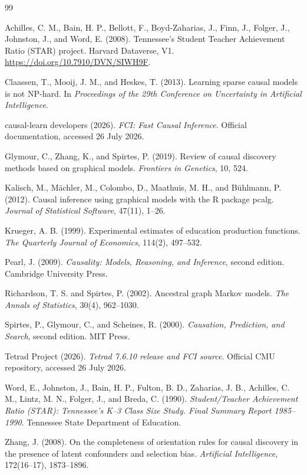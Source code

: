 \documentclass[11pt,a4paper]{article}
\begin{document}
\small

\begin{thebibliography}{99}

Achilles, C. M., Bain, H. P., Bellott, F., Boyd-Zaharias, J., Finn, J.,
Folger, J., Johnston, J., and Word, E. (2008).
Tennessee's Student Teacher Achievement Ratio (STAR) project.
Harvard Dataverse, V1. \url{https://doi.org/10.7910/DVN/SIWH9F}.

Claassen, T., Mooij, J. M., and Heskes, T. (2013).
Learning sparse causal models is not NP-hard.
In \textit{Proceedings of the 29th Conference on Uncertainty in Artificial
Intelligence}.

causal-learn developers (2026).
\textit{FCI: Fast Causal Inference}. Official documentation, accessed
26 July 2026.

Glymour, C., Zhang, K., and Spirtes, P. (2019).
Review of causal discovery methods based on graphical models.
\textit{Frontiers in Genetics}, 10, 524.

Kalisch, M., M{\"a}chler, M., Colombo, D., Maathuis, M. H., and
B{\"u}hlmann, P. (2012).
Causal inference using graphical models with the R package pcalg.
\textit{Journal of Statistical Software}, 47(11), 1--26.

Krueger, A. B. (1999).
Experimental estimates of education production functions.
\textit{The Quarterly Journal of Economics}, 114(2), 497--532.

Pearl, J. (2009).
\textit{Causality: Models, Reasoning, and Inference}, second edition.
Cambridge University Press.

Richardson, T. S. and Spirtes, P. (2002).
Ancestral graph Markov models.
\textit{The Annals of Statistics}, 30(4), 962--1030.

Spirtes, P., Glymour, C., and Scheines, R. (2000).
\textit{Causation, Prediction, and Search}, second edition. MIT Press.

Tetrad Project (2026).
\textit{Tetrad 7.6.10 release and FCI source}. Official CMU repository,
accessed 26 July 2026.

Word, E., Johnston, J., Bain, H. P., Fulton, B. D., Zaharias, J. B.,
Achilles, C. M., Lintz, M. N., Folger, J., and Breda, C. (1990).
\textit{Student/Teacher Achievement Ratio (STAR): Tennessee's K--3 Class
Size Study. Final Summary Report 1985--1990}.
Tennessee State Department of Education.

Zhang, J. (2008).
On the completeness of orientation rules for causal discovery in the
presence of latent confounders and selection bias.
\textit{Artificial Intelligence}, 172(16--17), 1873--1896.

\end{thebibliography}
\end{document}
